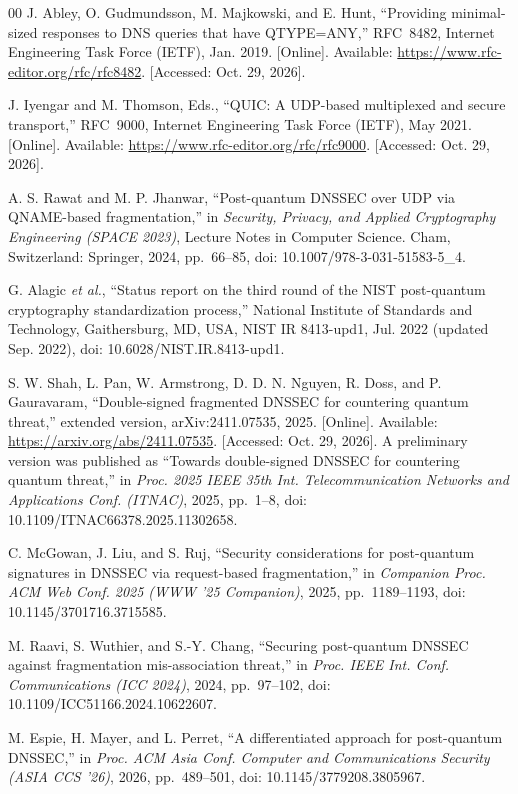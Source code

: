 \documentclass[conference]{IEEEtran}
\begin{document}
\begin{thebibliography}{00}
 J. Abley, O. Gudmundsson, M. Majkowski, and E. Hunt, ``Providing minimal-sized responses to DNS queries that have QTYPE=ANY,'' RFC~8482, Internet Engineering Task Force (IETF), Jan. 2019. [Online]. Available: \url{https://www.rfc-editor.org/rfc/rfc8482}. [Accessed: Oct. 29, 2026].

 J. Iyengar and M. Thomson, Eds., ``QUIC: A UDP-based multiplexed and secure transport,'' RFC~9000, Internet Engineering Task Force (IETF), May 2021. [Online]. Available: \url{https://www.rfc-editor.org/rfc/rfc9000}. [Accessed: Oct. 29, 2026].

 A. S. Rawat and M. P. Jhanwar, ``Post-quantum DNSSEC over UDP via QNAME-based fragmentation,'' in \emph{Security, Privacy, and Applied Cryptography Engineering (SPACE 2023)}, Lecture Notes in Computer Science. Cham, Switzerland: Springer, 2024, pp.~66--85, doi: 10.1007/978-3-031-51583-5\_4.

 G. Alagic \emph{et al.}, ``Status report on the third round of the NIST post-quantum cryptography standardization process,'' National Institute of Standards and Technology, Gaithersburg, MD, USA, NIST IR 8413-upd1, Jul. 2022 (updated Sep. 2022), doi: 10.6028/NIST.IR.8413-upd1.

 S. W. Shah, L. Pan, W. Armstrong, D. D. N. Nguyen, R. Doss, and P. Gauravaram, ``Double-signed fragmented DNSSEC for countering quantum threat,'' extended version, arXiv:2411.07535, 2025. [Online]. Available: \url{https://arxiv.org/abs/2411.07535}. [Accessed: Oct. 29, 2026]. A preliminary version was published as ``Towards double-signed DNSSEC for countering quantum threat,'' in \emph{Proc. 2025 IEEE 35th Int. Telecommunication Networks and Applications Conf. (ITNAC)}, 2025, pp.~1--8, doi: 10.1109/ITNAC66378.2025.11302658.

 C. McGowan, J. Liu, and S. Ruj, ``Security considerations for post-quantum signatures in DNSSEC via request-based fragmentation,'' in \emph{Companion Proc. ACM Web Conf. 2025 (WWW '25 Companion)}, 2025, pp.~1189--1193, doi: 10.1145/3701716.3715585.

 M. Raavi, S. Wuthier, and S.-Y. Chang, ``Securing post-quantum DNSSEC against fragmentation mis-association threat,'' in \emph{Proc. IEEE Int. Conf. Communications (ICC 2024)}, 2024, pp.~97--102, doi: 10.1109/ICC51166.2024.10622607.

 M. Espie, H. Mayer, and L. Perret, ``A differentiated approach for post-quantum DNSSEC,'' in \emph{Proc. ACM Asia Conf. Computer and Communications Security (ASIA CCS '26)}, 2026, pp.~489--501, doi: 10.1145/3779208.3805967.


\end{thebibliography}
\end{document}
